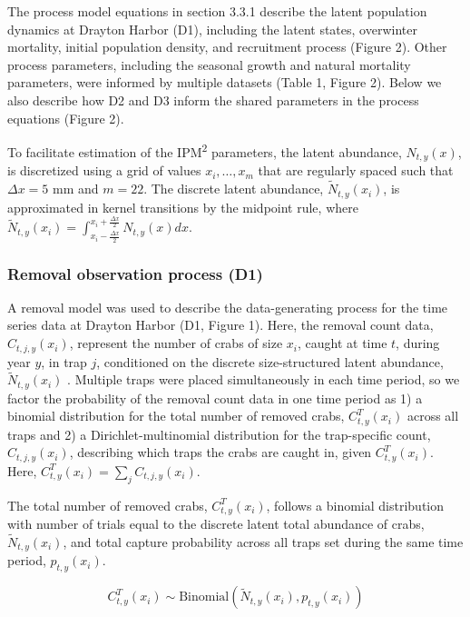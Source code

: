 \documentclass{article}
\begin{document}
The process model equations in section 3.3.1 describe the latent population dynamics at Drayton Harbor (D1), including the latent states, overwinter mortality, initial population density, and recruitment process (Figure 2). Other process parameters, including the seasonal growth and natural mortality parameters, were informed by multiple datasets (Table 1, Figure 2). Below we also describe how D2 and D3 inform the shared parameters in the process equations (Figure 2).

To facilitate estimation of the IPM\textsuperscript{2} parameters, the latent abundance, $N_{t,y}(x)$, is discretized using a grid of values $x_i , \ldots, x_m$ that are regularly spaced such that $\Delta x = 5$ mm and $m = 22$. The discrete latent abundance, $\tilde{N}_{t,y}(x_i)$, is approximated in kernel transitions by the midpoint rule, where $\tilde{N}_{t,y}(x_i) = \int_{x_i - \frac{\Delta x}{2}}^{x_i + \frac{\Delta x}{2}}N_{t,y}(x)dx$.

\subsubsection*{Removal observation process (D1)}

A removal model was used to describe the data-generating process for the time series data at Drayton Harbor (D1, Figure 1). Here, the removal count data, $C_{t,j,y}(x_i)$, represent the number of crabs of size $x_i$, caught at time $t$, during year $y$, in trap $j$, conditioned on the discrete size-structured latent abundance, $\tilde{N}_{t,y}(x_i)$ \parencite{kery2015modeling}. Multiple traps were placed simultaneously in each time period, so we factor the probability of the removal count data in one time period as 1) a binomial distribution for the total number of removed crabs, $C^T_{t,y}(x_i)$ across all traps and 2) a Dirichlet-multinomial distribution for the trap-specific count, $C_{t,j,y}(x_i)$, describing which traps the crabs are caught in, given $C^T_{t,y}(x_i)$. Here, $C^T_{t,y}(x_i) = \sum_jC_{t,j,y}(x_i)$. 

The total number of removed crabs, $C^T_{t,y}(x_i)$, follows a binomial distribution with number of trials equal to the discrete latent total abundance of crabs, $\tilde{N}_{t,y}(x_i)$, and total capture probability across all traps set during the same time period, $p_{t,y}(x_i)$.

\begin{equation}
C^T_{t,y}(x_i) \sim \text{Binomial}(\tilde{N}_{t,y}(x_i), p_{t,y}(x_i))
\end{equation}
\end{document}
